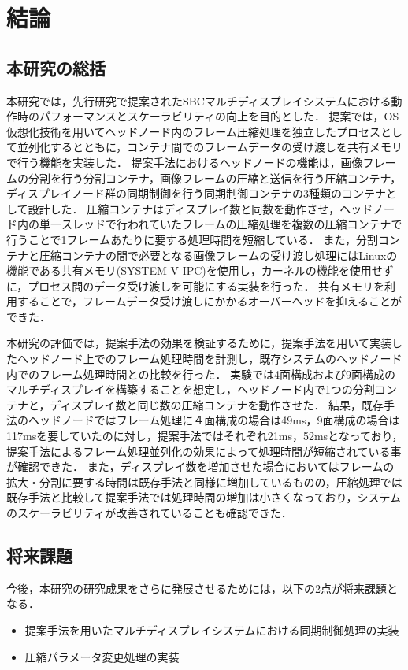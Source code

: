 \chapter{結論}

\section{本研究の総括}
本研究では，先行研究で提案されたSBCマルチディスプレイシステムにおける動作時のパフォーマンスとスケーラビリティの向上を目的とした．
提案では，OS仮想化技術を用いてヘッドノード内のフレーム圧縮処理を独立したプロセスとして並列化するとともに，コンテナ間でのフレームデータの受け渡しを共有メモリで行う機能を実装した．
提案手法におけるヘッドノードの機能は，画像フレームの分割を行う分割コンテナ，画像フレームの圧縮と送信を行う圧縮コンテナ，ディスプレイノード群の同期制御を行う同期制御コンテナの3種類のコンテナとして設計した．
圧縮コンテナはディスプレイ数と同数を動作させ，ヘッドノード内の単一スレッドで行われていたフレームの圧縮処理を複数の圧縮コンテナで行うことで1フレームあたりに要する処理時間を短縮している．
また，分割コンテナと圧縮コンテナの間で必要となる画像フレームの受け渡し処理にはLinuxの機能である共有メモリ(SYSTEM V IPC)を使用し，カーネルの機能を使用せずに，プロセス間のデータ受け渡しを可能にする実装を行った．
共有メモリを利用することで，フレームデータ受け渡しにかかるオーバーヘッドを抑えることができた．



本研究の評価では，提案手法の効果を検証するために，提案手法を用いて実装したヘッドノード上でのフレーム処理時間を計測し，既存システムのヘッドノード内でのフレーム処理時間との比較を行った．
実験では4面構成および9面構成のマルチディスプレイを構築することを想定し，ヘッドノード内で1つの分割コンテナと，ディスプレイ数と同じ数の圧縮コンテナを動作させた．
結果，既存手法のヘッドノードではフレーム処理に４面構成の場合は49ms，9面構成の場合は117msを要していたのに対し，提案手法ではそれぞれ21ms，52msとなっており，提案手法によるフレーム処理並列化の効果によって処理時間が短縮されている事が確認できた．
また，ディスプレイ数を増加させた場合においてはフレームの拡大・分割に要する時間は既存手法と同様に増加しているものの，圧縮処理では既存手法と比較して提案手法では処理時間の増加は小さくなっており，システムのスケーラビリティが改善されていることも確認できた．

\section{将来課題}
今後，本研究の研究成果をさらに発展させるためには，以下の2点が将来課題となる．
\begin{itemize}
    \item 提案手法を用いたマルチディスプレイシステムにおける同期制御処理の実装
    \item 圧縮パラメータ変更処理の実装
\end{itemize}

